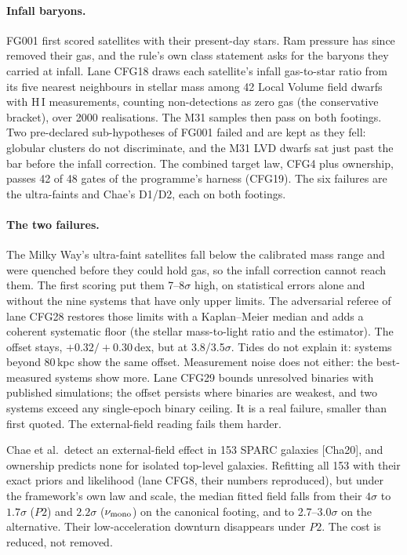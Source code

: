 \documentclass[10pt]{article}
\begin{document}
\paragraph{Infall baryons.} FG001 first scored satellites with their present-day stars. Ram pressure has since removed their gas, and the rule's own class statement asks for the baryons they carried at infall. Lane CFG18 draws each satellite's infall gas-to-star ratio from its five nearest neighbours in stellar mass among 42 Local Volume field dwarfs with H\,I measurements, counting non-detections as zero gas (the conservative bracket), over 2000 realisations. The M31 samples then pass on both footings. Two pre-declared sub-hypotheses of FG001 failed and are kept as they fell: globular clusters do not discriminate, and the M31 LVD dwarfs sat just past the bar before the infall correction. The combined target law, CFG4 plus ownership, passes 42 of 48 gates of the programme's harness (CFG19). The six failures are the ultra-faints and Chae's D1/D2, each on both footings.

\paragraph{The two failures.} The Milky Way's ultra-faint satellites fall below the calibrated mass range and were quenched before they could hold gas, so the infall correction cannot reach them. The first scoring put them 7--8$\sigma$ high, on statistical errors alone and without the nine systems that have only upper limits. The adversarial referee of lane CFG28 restores those limits with a Kaplan--Meier median and adds a coherent systematic floor (the stellar mass-to-light ratio and the estimator). The offset stays, $+0.32/+0.30$\,dex, but at 3.8/3.5$\sigma$. Tides do not explain it: systems beyond 80\,kpc show the same offset. Measurement noise does not either: the best-measured systems show more. Lane CFG29 bounds unresolved binaries with published simulations; the offset persists where binaries are weakest, and two systems exceed any single-epoch binary ceiling. It is a real failure, smaller than first quoted. The external-field reading fails them harder.

Chae et al.\ detect an external-field effect in 153 SPARC galaxies [Cha20], and ownership predicts none for isolated top-level galaxies. Refitting all 153 with their exact priors and likelihood (lane CFG8, their numbers reproduced), but under the framework's own law and scale, the median fitted field falls from their $4\sigma$ to $1.7\sigma$ ($P2$) and $2.2\sigma$ ($\nu_{\rm mono}$) on the canonical footing, and to 2.7--3.0$\sigma$ on the alternative. Their low-acceleration downturn disappears under $P2$. The cost is reduced, not removed.
\end{document}
